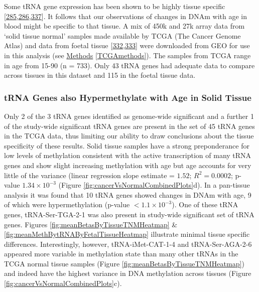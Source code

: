 \documentclass[
]{book}
\begin{document}
Some tRNA gene expression has been shown to be highly tissue specific {[}\protect\hyperlink{ref-Dittmar2006}{285},\protect\hyperlink{ref-Sagi2016}{286},\protect\hyperlink{ref-Schmitt2014b}{337}{]}.
It follows that our observations of changes in DNAm with age in blood might be specific to that tissue.
A mix of 450k and 27k array data from `solid tissue normal' samples made available by TCGA (The Cancer Genome Atlas) and data from foetal tissue {[}\protect\hyperlink{ref-Yang2016}{332},\protect\hyperlink{ref-Nazor2012}{333}{]} were downloaded from GEO for use in this analysis (see \protect\hyperlink{TCGAmethods}{Methods} \ref{TCGAmethods}).
The samples from TCGA range in age from 15-90 (n = 733).
Only 43 tRNA genes had adequate data to compare across tissues in this dataset and 115 in the foetal tissue data.

\hypertarget{trna-genes-also-hypermethylate-with-age-in-solid-tissue}{%
\subsubsection{tRNA Genes also Hypermethylate with Age in Solid Tissue}\label{trna-genes-also-hypermethylate-with-age-in-solid-tissue}}

Only 2 of the 3 tRNA genes identified as genome-wide significant and a further 1 of the study-wide significant tRNA genes are present in the set of 45 tRNA genes in the TCGA data, thus limiting our ability to draw conclusions about the tissue specificity of these results.
Solid tissue samples have a strong preponderance for low levels of methylation consistent with the active transcription of many tRNA genes and show slight increasing methylation with age but age accounts for very little of the variance (linear regression slope estimate = \(1.52\); \(R^2= 0.0002\); p-value \(1.34\times10^{-3}\) (Figure \ref{fig:cancerVsNormalCombinedPlots}d).
In a pan-tissue analysis it was found that 10 tRNA genes showed changes in DNAm with age, 9 of which were hypermethylation (p-value \(<1.1\times10^{-3}\)).
One of these tRNA genes, tRNA-Ser-TGA-2-1 was also present in study-wide significant set of tRNA genes.
Figures \ref{fig:meanBetasByTissueTNMHeatmap} \& \ref{fig:meanMethBytRNAByFetalTissueHeatmap} illustrate minimal tissue specific differences.
Interestingly, however, tRNA-iMet-CAT-1-4 and tRNA-Ser-AGA-2-6 appeared more variable in methylation state than many other tRNAs in the TCGA normal tissue samples (Figure \ref{fig:meanBetasByTissueTNMHeatmap}) and indeed have the highest variance in DNA methylation across tissues (Figure \ref{fig:cancerVsNormalCombinedPlots}c).
\end{document}
